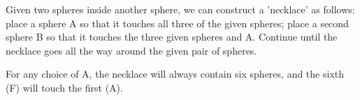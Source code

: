  Given two spheres inside another sphere, we can construct a
'necklace' as follows: place a sphere A so that it touches all
three of the given spheres; place a second sphere B so that it 
touches the three given spheres and A. Continue until the necklace
goes all the way around the given pair of spheres.
\par
For any choice of A, the necklace will always contain six spheres,
and the sixth (F) will touch the first (A).
